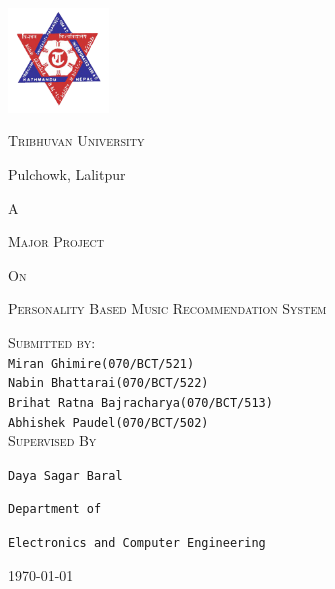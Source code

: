 \documentclass[a4paper, 12pt, onepage]{article}
\begin{document}
\begin{titlepage}
  \centering
  \includegraphics[width=0.2\textwidth]{tu_logo.png}\par
  {\large\scshape Tribhuvan University\par}
  \vspace{0.3cm}
  {\large Pulchowk, Lalitpur \par}
  \vspace{3cm}
  	{\large\scshape A\par}
	{\large\scshape Major Project\par}
        {\large\scshape On\par}
        {\large\scshape Personality Based Music Recommendation System\par}
	\vspace{2.5cm}
        {\large\scshape Submitted by:}\\
        \vspace{0.2cm}
        {
          {\normalsize\verb+Miran Ghimire(070/BCT/521)+}\\
          \vspace{0.1cm}
          {\normalsize\verb+Nabin Bhattarai(070/BCT/522)+}\\
          \vspace{0.1cm}
          {\normalsize\verb+Brihat Ratna Bajracharya(070/BCT/513)+}\\
          \vspace{0.1cm}
          {\normalsize\verb+Abhishek Paudel(070/BCT/502)+}\\
          \vspace{0.1cm}
        }
        \vspace{1cm}
        {\large\scshape Supervised By}\\
        \vspace{0.2cm}
        {
          {\normalsize \verb+Daya Sagar Baral+\par}
          \vspace{0.1cm}
          {\normalsize \verb+Department of+\par}
          \vspace{0.1cm}
          {\normalsize\verb+Electronics and Computer Engineering+}
          \vspace{0.1cm}
        }
        
        \vspace{1cm}
        \vfill

	{\normalsize \today\par}
      \end{titlepage}
\end{document}
